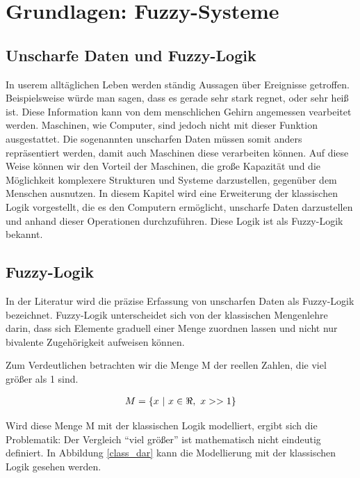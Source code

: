 \chapter{Grundlagen: Fuzzy-Systeme}


\section{Unscharfe Daten und Fuzzy-Logik}
In userem alltäglichen Leben werden ständig Aussagen über Ereignisse getroffen. Beispielsweise würde man sagen, dass es gerade sehr stark regnet, oder sehr heiß ist. Diese Information kann von dem menschlichen Gehirn angemessen vearbeitet werden. Maschinen, wie Computer, sind jedoch nicht mit dieser Funktion ausgestattet. Die sogenannten unscharfen Daten müssen somit anders repräsentiert werden, damit auch Maschinen diese verarbeiten können. Auf diese Weise können wir den Vorteil der Maschinen, die große Kapazität und die Möglichkeit komplexere Strukturen und Systeme darzustellen, gegenüber dem Menschen ausnutzen. In diesem Kapitel wird eine Erweiterung der klassischen Logik vorgestellt, die es den Computern ermöglicht, unscharfe Daten darzustellen und anhand dieser Operationen durchzuführen. Diese Logik ist als Fuzzy-Logik bekannt.

\section{Fuzzy-Logik}\label{fuzzy_logik}


In der Literatur wird die präzise Erfassung von unscharfen Daten als Fuzzy-Logik bezeichnet. Fuzzy-Logik unterscheidet sich von der klassischen Mengenlehre darin, dass sich Elemente graduell einer Menge zuordnen lassen und nicht nur bivalente Zugehörigkeit aufweisen können.

Zum Verdeutlichen betrachten wir die Menge M der reellen Zahlen, die viel größer als 1 sind.

\begin{align}
\centering
M = \{ x \ |\ x \in \Re,\ x >> 1\}
\end{align}

Wird diese Menge M mit der klassischen Logik modelliert, ergibt sich die Problematik: Der Vergleich ``viel größer'' ist mathematisch nicht eindeutig definiert. In Abbildung \ref{class_dar} kann die Modellierung mit der klassischen Logik gesehen werden.

